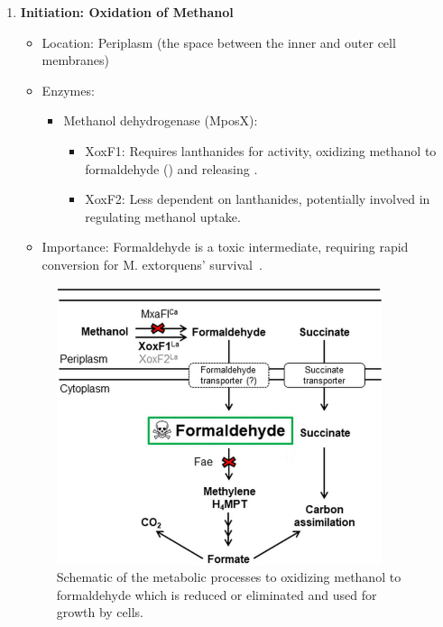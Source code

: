 \begin{enumerate}
    \item \textbf{Initiation: Oxidation of Methanol}
    \begin{itemize}
        \item Location: Periplasm (the space between the inner and outer cell membranes)
        \item Enzymes:
        \begin{itemize}
            \item Methanol dehydrogenase (MposX):
            \begin{itemize}
                \item XoxF1: Requires lanthanides for activity, oxidizing methanol to
                formaldehyde () and releasing .
                \item XoxF2: Less dependent on lanthanides, potentially involved in
                regulating methanol uptake.
            \end{itemize}
        \end{itemize}
        \item Importance: Formaldehyde is a toxic intermediate, requiring rapid conversion for M. extorquens' survival~\cite{methanol_metabolism}.
    \end{itemize}
    \begin{figure}[H]
        \centering
        \includegraphics[width=0.9\textwidth]{./media/images/mextorquens_metabolism_methanol}
        \caption{Schematic of the metabolic processes to oxidizing methanol to formaldehyde which is reduced or eliminated and used for growth by cells.}

\end{figure}
\end{enumerate}
